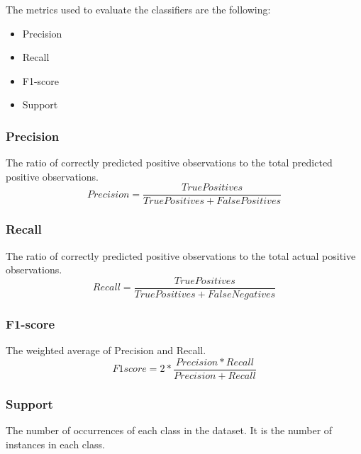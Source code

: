 The metrics used to evaluate the classifiers are the following:
\begin{itemize}
  \item Precision
  \item Recall
  \item F1-score
  \item Support
\end{itemize}

\subsubsection{Precision}
The ratio of correctly predicted positive observations to the total predicted 
positive observations.
\begin{equation}
  Precision = \frac{TruePositives}{TruePositives + FalsePositives}
\end{equation}

\subsubsection{Recall}
The ratio of correctly predicted positive observations to the total actual positive observations.
\begin{equation}
  Recall = \frac{TruePositives}{TruePositives + FalseNegatives}
\end{equation}

\subsubsection{F1-score}
The weighted average of Precision and Recall.
\begin{equation}
  F1score = 2 * \frac{Precision * Recall}{Precision + Recall}
\end{equation}

\subsubsection{Support}
The number of occurrences of each class in the dataset. It is the number of instances in each class.